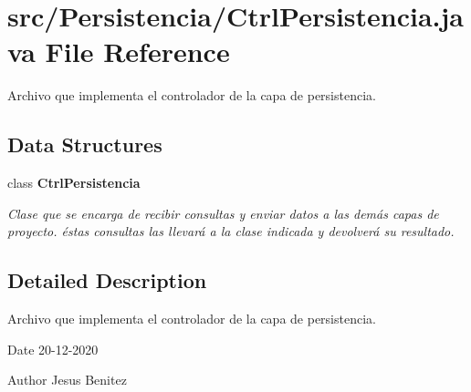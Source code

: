 \section{src/\+Persistencia/\+Ctrl\+Persistencia.java File Reference}
\label{_ctrl_persistencia_8java}


Archivo que implementa el controlador de la capa de persistencia.  


\subsection*{Data Structures}
\begin{DoxyCompactItemize}
\item 
class \textbf{ Ctrl\+Persistencia}
\begin{DoxyCompactList}\small\item\em Clase que se encarga de recibir consultas y enviar datos a las demás capas de proyecto. éstas consultas las llevará a la clase indicada y devolverá su resultado. \end{DoxyCompactList}\end{DoxyCompactItemize}


\subsection{Detailed Description}
Archivo que implementa el controlador de la capa de persistencia. 

\begin{DoxyDate}{Date}
20-\/12-\/2020 
\end{DoxyDate}
\begin{DoxyAuthor}{Author}
Jesus Benitez 
\end{DoxyAuthor}
